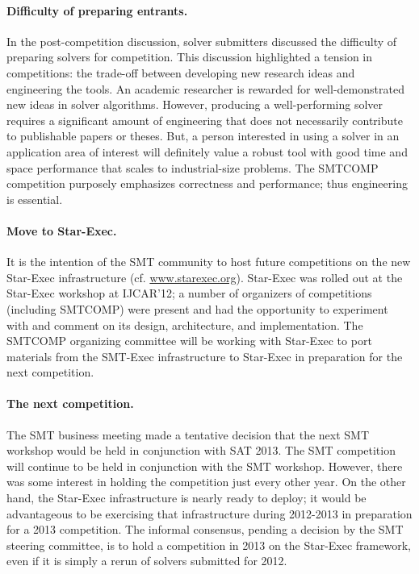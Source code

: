 \documentclass{llncs}
\begin{document}
\paragraph{Difficulty of preparing entrants.} In the post-competition discussion, solver submitters discussed the difficulty of preparing solvers for competition. This discussion highlighted a tension in competitions: the trade-off between developing new research ideas and engineering the tools. An academic researcher is rewarded for well-demonstrated new ideas in solver algorithms. However, producing a well-performing solver requires a significant amount of engineering that does not necessarily contribute to publishable papers or theses. 
But, a person interested in using a solver in an application area of interest will definitely value a robust tool with good time and space performance that scales to industrial-size problems. The SMTCOMP competition purposely emphasizes correctness and performance; thus engineering is essential.

\paragraph{Move to Star-Exec.} It is the intention of the SMT community to host future competitions on the new Star-Exec infrastructure (cf. \url{www.starexec.org}). Star-Exec was rolled out at the Star-Exec workshop at IJCAR'12; a number of organizers of competitions (including SMTCOMP) were present and had the opportunity to experiment with and comment on its 
design, architecture, and implementation. The SMTCOMP organizing committee will be working with Star-Exec to port materials from the SMT-Exec infrastructure to Star-Exec in preparation for the next competition.


\paragraph{The next competition.} The SMT business meeting made a tentative decision that the next SMT workshop would be held in conjunction with SAT 2013. The SMT competition will continue to be held in conjunction with the SMT workshop. However, there was some interest in holding the competition just every other year. On the other hand, the Star-Exec infrastructure is nearly ready to deploy; it would be advantageous to be exercising that infrastructure during 2012-2013 in preparation for a 2013 competition. The informal consensus, pending a decision by the SMT steering committee, is to hold a competition in 2013 on the Star-Exec framework, even if it is simply a rerun of solvers submitted for 2012.
\end{document}

